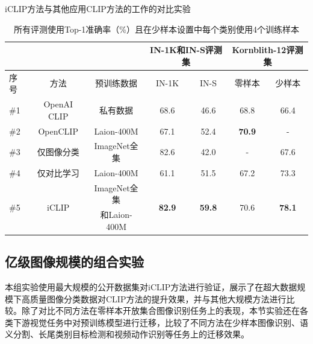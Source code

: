 \begin{table}
  \centering
    \caption{iCLIP方法与其他应用CLIP方法的工作的对比实验}
  \begin{tabular}{lcccccc}
    \toprule
    \multicolumn{1}{c}{} & \multicolumn{1}{c}{} & \multicolumn{1}{c}{} & \multicolumn{2}{c}{IN-1K和IN-S评测集} &
    \multicolumn{2}{c}{Kornblith-12评测集} \\
    \midrule
    序号 & 方法 & 预训练数据 & IN-1K & IN-S & 零样本 & 少样本\\
    \midrule
    \#1 & OpenAI CLIP & 私有数据 & 68.6 & 46.6 & 68.8 & 66.4 \\
    
    \#2 & OpenCLIP & Laion-400M & 67.1 & 52.4 & \textbf{70.9} & -\\ %
 
    \midrule
    \#3 & 仅图像分类 & ImageNet全集 & 82.6 & 42.0 & - & 67.6 \\
    \#4 & 仅对比学习 & Laion-400M & 61.1 & 51.5 & 67.2 & 73.3 \\
    \multirow{2}{*}{\#5} & \multirow{2}{*}{iCLIP} & ImageNet全集 & \multirow{2}{*}{\textbf{82.9}} & \multirow{2}{*}{\textbf{59.8}} & \multirow{2}{*}{70.6} & \multirow{2}{*}{\textbf{78.1}} \\
    & & 和Laion-400M & & & & \\
    \bottomrule
  \end{tabular}
  \caption*{所有评测使用Top-1准确率（\%）且在少样本设置中每个类别使用4个训练样本}
  \label{tab:iclip-overall-zeroshot}
\end{table}



\subsection{亿级图像规模的组合实验}
\label{sec:iclip-22k-laion}
本组实验使用最大规模的公开数据集对iCLIP方法进行验证，展示了在超大数据规模下高质量图像分类数据对CLIP方法的提升效果，并与其他大规模方法进行比较。除了对比不同方法在零样本开放集合图像识别任务上的表现，本节实验还在各类下游视觉任务中对预训练模型进行迁移，比较了不同方法在少样本图像识别、语义分割、长尾类别目标检测和视频动作识别等任务上的迁移效果。

